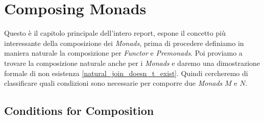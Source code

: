 \section{Composing Monads}
\label{composing_monads}

Questo è il capitolo principale dell'intero report, espone il concetto più
interessante della composizione dei \textit{Monads}, prima di procedere
definiamo in maniera naturale la composizione per \textit{Functor} e
\textit{Premonads}.
Poi proviamo a trovare la composizione naturale anche per i \textit{Monads} e
daremo una dimostrazione formale di non esistenza
\ref{natural_join_doesn_t_exist}.
Quindi cercheremo di classificare quali condizioni sono necessarie per
comporre due \textit{Monads} $M$ e $N$.

\subsection{Conditions for Composition}
\label{conditions_for_composition}

